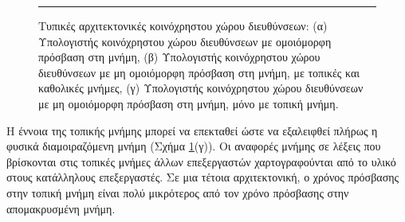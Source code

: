 \documentclass[12pt,a4paper]{article}
\begin{document}
\begin{figure}[H]
\noindent\rule{\textwidth}{0.2pt}
\caption{Τυπικές αρχιτεκτονικές κοινόχρηστου χώρου διευθύνσεων:
(α) Υπολογιστής κοινόχρηστου χώρου διευθύνσεων με ομοιόμορφη πρόσβαση στη μνήμη,
(β) Υπολογιστής κοινόχρηστου χώρου διευθύνσεων με μη ομοιόμορφη πρόσβαση στη μνήμη, με τοπικές και καθολικές μνήμες,
(γ) Υπολογιστής κοινόχρηστου χώρου διευθύνσεων με μη ομοιόμορφη πρόσβαση στη μνήμη, μόνο με τοπική μνήμη.}
\label{fig:graph32}
\end{figure}
\vspace{0.3cm}

Η έννοια της τοπικής μνήμης μπορεί να επεκταθεί ώστε να εξαλειφθεί πλήρως 
η φυσικά διαμοιραζόμενη μνήμη {(}Σχήμα \ref{fig:graph32}(γ){)}. Οι αναφορές μνήμης σε λέξεις 
που βρίσκονται στις τοπικές μνήμες άλλων επεξεργαστών χαρτογραφούνται από 
το υλικό στους κατάλληλους επεξεργαστές. Σε μια τέτοια 
αρχιτεκτονική, ο χρόνος πρόσβασης στην τοπική μνήμη είναι πολύ μικρότερος 
από τον χρόνο πρόσβασης στην απομακρυσμένη μνήμη.
\end{document}
